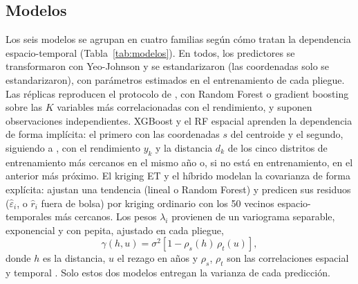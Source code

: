 \documentclass[conference,letterpaper]{IEEEtran}
\begin{document}
\subsection{Modelos}
Los seis modelos se agrupan en cuatro familias según cómo tratan la dependencia espacio-temporal (Tabla~\ref{tab:modelos}). En todos, los predictores se transformaron con Yeo-Johnson y se estandarizaron (las coordenadas solo se estandarizaron), con parámetros estimados en el entrenamiento de cada pliegue. Las réplicas reproducen el protocolo de \cite{tamayovera2025}, con Random Forest \cite{breiman2001} o gradient boosting \cite{chen2016} sobre las $K$ variables más correlacionadas con el rendimiento, y suponen observaciones independientes. XGBoost y el RF espacial aprenden la dependencia de forma implícita: el primero con las coordenadas $s$ del centroide y el segundo, siguiendo a \cite{sekulic2020}, con el rendimiento $y_k$ y la distancia $d_k$ de los cinco distritos de entrenamiento más cercanos en el mismo año o, si no está en entrenamiento, en el anterior más próximo. El kriging ET y el híbrido modelan la covarianza de forma explícita: ajustan una tendencia (lineal o Random Forest) y predicen sus residuos ($\hat\varepsilon_i$, o $\hat r_i$ fuera de bolsa) por kriging ordinario con los 50 vecinos espacio-temporales más cercanos. Los pesos $\lambda_i$ provienen de un variograma separable, exponencial y con pepita, ajustado en cada pliegue,
\begin{equation}
\gamma(h,u)=\sigma^2\left[1-\rho_s(h)\,\rho_t(u)\right],
\end{equation}
donde $h$ es la distancia, $u$ el rezago en años y $\rho_s$, $\rho_t$ son las correlaciones espacial y temporal \cite{graler2016}. Solo estos dos modelos entregan la varianza de cada predicción.
\end{document}
